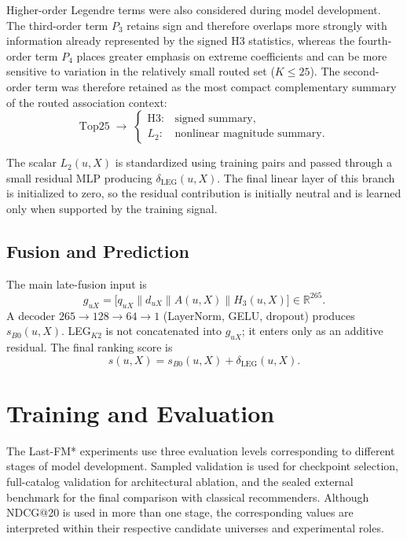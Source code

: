 Higher-order Legendre terms were also considered during model development.
The third-order term $P_3$ retains sign and therefore overlaps more strongly with information already represented by the signed H3 statistics, whereas the fourth-order term $P_4$ places greater emphasis on extreme coefficients and can be more sensitive to variation in the relatively small routed set ($K\le 25$).
The second-order term was therefore retained as the most compact complementary summary of the routed association context:
\begin{equation*}
\mathrm{Top}25
\;\longrightarrow\;
\begin{cases}
\mathrm{H3}: & \text{signed summary},\\
L_2: & \text{nonlinear magnitude summary}.
\end{cases}
\end{equation*}

The scalar $L_2(u,X)$ is standardized using training pairs and passed through a small residual MLP producing $\delta_{\mathrm{LEG}}(u,X)$.
The final linear layer of this branch is initialized to zero, so the residual contribution is initially neutral and is learned only when supported by the training signal.

\subsection{Fusion and Prediction}
\label{sec:lastfm-fusion}

The main late-fusion input is
\begin{equation}
\label{eq:lastfm-265}
g_{uX}
=
\bigl[q_{uX}\parallel d_{uX}\parallel A(u,X)\parallel H_3(u,X)\bigr]
\in\mathbb{R}^{265}.
\end{equation}
A decoder $265\to 128\to 64\to 1$ (LayerNorm, GELU, dropout) produces $s_{B0}(u,X)$.
LEG$_{K2}$ is not concatenated into $g_{uX}$; it enters only as an additive residual.
The final ranking score is
\begin{equation}
\label{eq:lastfm-score-final}
s(u,X)=s_{B0}(u,X)+\delta_{\mathrm{LEG}}(u,X).
\end{equation}

\section{Training and Evaluation}
\label{sec:lastfm-train-eval}

The Last-FM* experiments use three evaluation levels corresponding to different stages of model development.
Sampled validation is used for checkpoint selection, full-catalog validation for architectural ablation, and the sealed external benchmark for the final comparison with classical recommenders.
Although NDCG@20 is used in more than one stage, the corresponding values are interpreted within their respective candidate universes and experimental roles.

